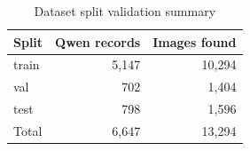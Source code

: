 \documentclass{article}
\begin{document}
\begin{table}[htbp]
  \centering
  \caption{Dataset split validation summary}
  \label{tab:dataset_splits}
  \begin{tabular}{lrr}
    \toprule
    \textbf{Split} & \textbf{Qwen records} & \textbf{Images found} \\
    \midrule
    train & 5,147 & 10,294 \\
    val & 702 & 1,404 \\
    test & 798 & 1,596 \\
    Total & 6,647 & 13,294 \\
    \bottomrule
  \end{tabular}
\end{table}
\end{document}
